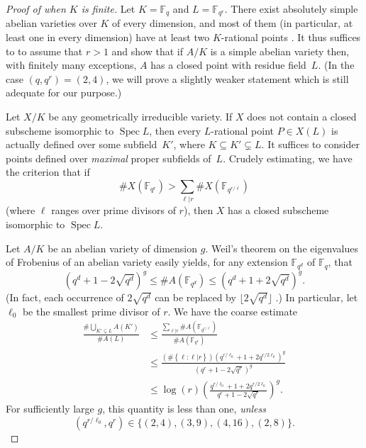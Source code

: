 \documentclass[11pt, reqno]{amsart}
\numberwithin{equation}{section}
\theoremstyle{definition}
\theoremstyle{remark}
\def\ff{{\mathbb F}}
\DeclareMathOperator{\spec}{Spec}
\newcommand{\st}[1]{\left\{#1\right\}}
\newcommand{\floor}[1]{\lfloor #1 \rfloor}
\begin{document}
\begin{proof}[Proof of  when $K$ is finite]
  Let $K = \ff_q$ and $L = \ff_{q^r}$.  There exist absolutely simple
  abelian varieties over $K$ of every dimension, and most of them (in
  particular, at least one in every dimension) have at least two
  $K$-rational points \cite{howezhu02}.  It thus suffices to to assume
  that $r>1$ and show that if $A/K$ is a simple abelian variety then,
  with finitely many exceptions, $A$ has a closed point with residue
  field~$L$.  (In the case $(q,q^r) = (2,4)$, we will prove a slightly
  weaker statement which is still adequate for our purpose.)
  
  Let $X/K$ be any geometrically
irreducible variety.  If $X$ does not contain a closed subscheme
isomorphic to $\spec L$, then every $L$-rational point $P\in
X(L)$ is actually defined over some subfield~$K'$, where $K\subseteq
K' \subsetneq L$.  It suffices to consider points defined over
\emph{maximal} proper subfields of~$L$.  Crudely estimating, we have
the criterion that if
\[
  \# X(\ff_{q^r}) > \sum_{\ell | r} \# X(\ff_{q^{r/\ell}})
\]
(where $\ell$ ranges over prime divisors of $r$), then $X$ has a
closed subscheme isomorphic to $\spec L$.

Let $A/K$ be an abelian variety of dimension $g$.  Weil's theorem on
the eigenvalues of Frobenius of an abelian variety easily yields, for
any extension $\ff_{q^d}$ of $\ff_q$, that
\[
(q^d + 1 - {2\sqrt{q^d}})^g \le \# A(\ff_{q^d}) \le (q^d + 1 +
{2\sqrt{q^d}})^g.
\]
(In fact, each occurrence of ${2\sqrt{q^d}}$ can be replaced by $\floor{2\sqrt{q^d}}$ \cite[\S 1]{aubryhalouilachaud13}.)
In particular, let $\ell_0$ be the smallest prime divisor of $r$.  We have the coarse estimate
\begin{align*}
  \frac{\# \bigcup_{K' \subsetneq L} A(K')}{\#A(L)} &  \le
                                                      \frac{\sum_{\ell|r}
                                                      \#
                                                      A(\ff_{q^{r/\ell}})}{\#A(\ff_{q^r})}\\
   & \le \frac{\left(\# \st{ \ell: \ell|r}\right) (q^{r/\ell_0} + 1 +
     {2 q^{r/2\ell_0}})^g}{(q^r+1-{2\sqrt{q^r}})^g}\\
   & \le
     \log(r) \left(
\frac{q^{r/\ell_0} + 1 +
     {2 q^{r/2\ell_0}}}{q^r+1-{2\sqrt{q^r}}}
     \right)^g.
\end{align*}
For sufficiently large $g$, this quantity is less than one,
\emph{unless} $$(q^{r/\ell_0}, q^r) \in \{(2,4),(3,9),(4,16),(2,8)\}.$$


\end{proof}
\end{document}
